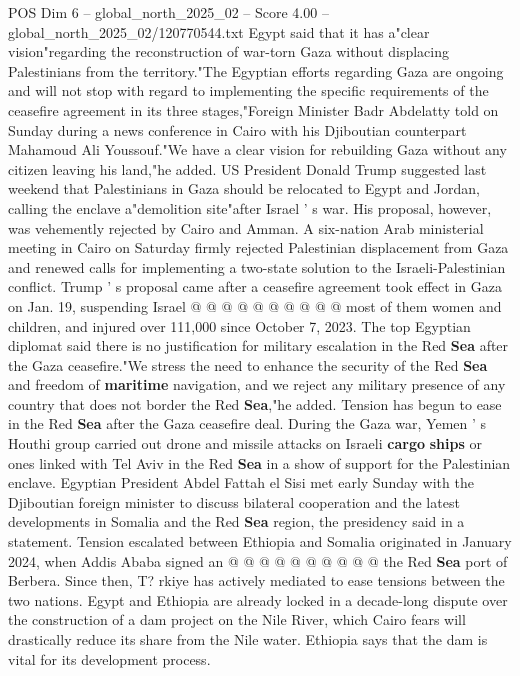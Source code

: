 \begin{textsample}{POS Dim 6 – global\_north\_2025\_02 – Score 4.00 – global\_north\_2025\_02/120770544.txt}  \label{ex:f6_pos_350}
Egypt said that it has a"clear vision"regarding the reconstruction of war-torn Gaza without displacing Palestinians from the territory."The Egyptian efforts regarding Gaza are ongoing and will not stop with regard to implementing the specific requirements of the ceasefire agreement in its three stages,"Foreign Minister Badr Abdelatty told on Sunday during a news conference in Cairo with his Djiboutian counterpart Mahamoud Ali Youssouf."We have a clear vision for rebuilding Gaza without any citizen leaving his land,"he added.
US President Donald Trump suggested last weekend that Palestinians in Gaza should be relocated to Egypt and Jordan, calling the enclave a"demolition site"after Israel ' s war.
His proposal, however, was vehemently rejected by Cairo and Amman.
A six-nation Arab ministerial meeting in Cairo on Saturday firmly rejected Palestinian displacement from Gaza and renewed calls for implementing a two-state solution to the Israeli-Palestinian conflict.
Trump ' s proposal came after a ceasefire agreement took effect in Gaza on Jan. 19, suspending Israel @ @ @ @ @ @ @ @ @ @ most of them women and children, and injured over 111,000 since October 7, 2023.
The top Egyptian diplomat said there is no justification for military escalation in the Red \textbf{Sea} after the Gaza ceasefire."We stress the need to enhance the security of the Red \textbf{Sea} and freedom of \textbf{maritime} navigation, and we reject any military presence of any country that does not border the Red \textbf{Sea},"he added.
Tension has begun to ease in the Red \textbf{Sea} after the Gaza ceasefire deal.
During the Gaza war, Yemen ' s Houthi group carried out drone and missile attacks on Israeli \textbf{cargo} \textbf{ships} or ones linked with Tel Aviv in the Red \textbf{Sea} in a show of support for the Palestinian enclave.
Egyptian President Abdel Fattah el Sisi met early Sunday with the Djiboutian foreign minister to discuss bilateral cooperation and the latest developments in Somalia and the Red \textbf{Sea} region, the presidency said in a statement.
Tension escalated between Ethiopia and Somalia originated in January 2024, when Addis Ababa signed an @ @ @ @ @ @ @ @ @ @ the Red \textbf{Sea} port of Berbera.
Since then, T? rkiye has actively mediated to ease tensions between the two nations.
Egypt and Ethiopia are already locked in a decade-long dispute over the construction of a dam project on the Nile River, which Cairo fears will drastically reduce its share from the Nile water.
Ethiopia says that the dam is vital for its development process.

\end{textsample}
